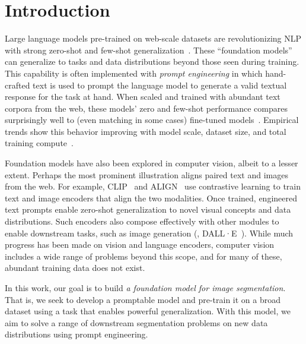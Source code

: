 \section{Introduction}\label{sec:intro}

Large language models pre-trained on web-scale datasets are revolutionizing NLP with strong zero-shot and few-shot generalization~\cite{Brown2020}. These ``foundation models''~\cite{bommasani2021opportunities} can generalize to tasks and data distributions beyond those seen during training. This capability is often implemented with \emph{prompt engineering} in which hand-crafted text is used to prompt the language model to generate a valid textual response for the task at hand. When scaled and trained with abundant text corpora from the web, these models' zero and few-shot performance compares surprisingly well to (even matching in some cases) fine-tuned models~\cite{Brown2020,chowdhery2022palm}. Empirical trends show this behavior improving with model scale, dataset size, and total training compute~\cite{kaplan2020scaling,Brown2020,chowdhery2022palm,hoffmann2022training}.

Foundation models have also been explored in computer vision, albeit to a lesser extent. Perhaps the most prominent illustration aligns paired text and images from the web. For example, CLIP~\cite{Radford2021} and ALIGN~\cite{jia2021scaling} use contrastive learning to train text and image encoders that align the two modalities. Once trained, engineered text prompts enable zero-shot generalization to novel visual concepts and data distributions. Such encoders also compose effectively with other modules to enable downstream tasks, such as image generation (\eg, DALL·E~\cite{Ramesh2021}). While much progress has been made on vision and language encoders, computer vision includes a wide range of problems beyond this scope, and for many of these, abundant training data does not exist.

In this work, our goal is to build \emph{a foundation model for image segmentation}. That is, we seek to develop a promptable model and pre-train it on a broad dataset using a task that enables powerful generalization. With this model, we aim to solve a range of downstream segmentation problems on new data distributions using prompt engineering.

